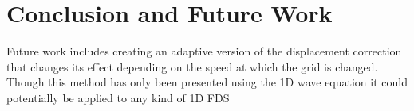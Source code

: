 \section{Conclusion and Future Work}

Future work includes creating an adaptive version of the displacement correction that changes its effect depending on the speed at which the grid is changed.  
Though this method has only been presented using the 1D wave equation it could potentially be applied to any kind of 1D FDS 